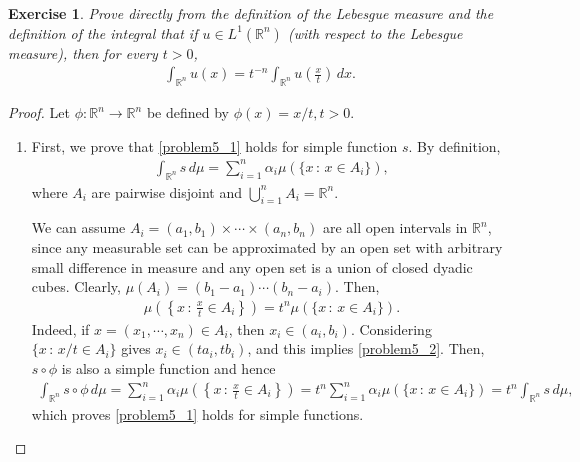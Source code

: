 \documentclass[11pt]{book}
\newtheorem{exercise}{Exercise}[section]
\theoremstyle{definition}
\numberwithin{equation}{chapter}
\begin{document}
\medskip

\begin{exercise}
Prove directly from the definition of the Lebesgue measure and the definition of the integral that if $u \in L^1(\mathbb{R}^n)$ (with respect to the Lebesgue measure), then for every $t > 0$,
\begin{align}\label{problem5_1}
    \int_{\mathbb{R}^n} u(x) = t^{-n} \int_{\mathbb{R}^n} u \left(\frac{x}{t}\right) \,dx.  
\end{align}
\end{exercise}
\begin{proof}
Let $\phi: \mathbb{R}^n \to \mathbb{R}^n$ be defined by $\phi(x) = x/t, t > 0$.
\begin{enumerate}[label=(\alph*)]
    \item First, we prove that \eqref{problem5_1} holds for simple function $s$. By definition,
    \begin{align*}
        \int_{\mathbb{R}^n} s\,d\mu = \sum^n_{i=1} \alpha_i \mu(\{ x \,:\, x \in A_i\}),
    \end{align*}
    where $A_i$ are pairwise disjoint and $\bigcup^n_{i=1}A_i = \mathbb{R}^n$. 

    We can assume $A_i = (a_1,b_1) \times \cdots \times (a_n,b_n)$ are all open intervals in $\mathbb{R}^n$, since any measurable set can be approximated by an open set with arbitrary small difference in measure and any open set is a union of closed dyadic cubes. Clearly, $\mu(A_i) = (b_1 - a_1) \cdots (b_n - a_i)$. Then,
    \begin{align}\label{problem5_2}
        \mu \left( \left\{x \,:\, \frac{x}{t} \in A_i \right\} \right) = t^n \mu(\{ x \,:\, x \in A_i\}).
    \end{align}
    Indeed, if $x = (x_1,\cdots,x_n) \in A_i$, then $x_i \in (a_i,b_i)$. Considering $\{x \,:\, x/t \in A_i\}$ gives $x_i \in (ta_i,tb_i)$, and this implies \eqref{problem5_2}. Then, $s \circ \phi$ is also a simple function and hence
    \begin{align*}
        \int_{\mathbb{R}^n} s \circ \phi\,d\mu = \sum^n_{i=1} \alpha_i \mu \left( \left\{x \,:\, \frac{x}{t} \in A_i \right\} \right) = t^n \sum^n_{i=1} \alpha_i \mu(\{ x \,:\, x \in A_i\}) = t^n \int_{\mathbb{R}^n} s\,d\mu,
    \end{align*}
    which proves \eqref{problem5_1} holds for simple functions.\label{problem5_part_a}
    

\end{enumerate}
\end{proof}
\end{document}
